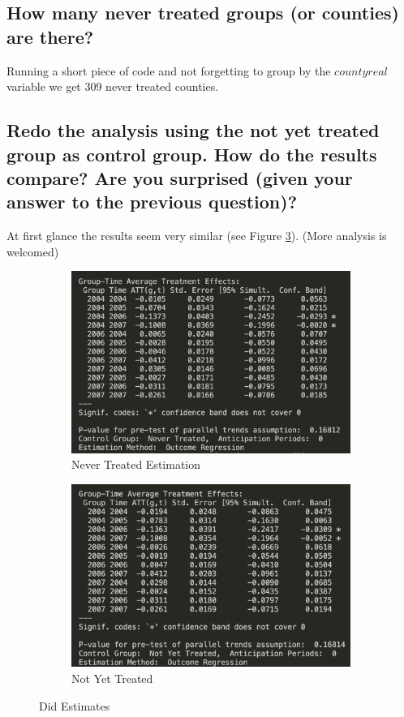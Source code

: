 \documentclass[12pt]{article}
\begin{document}
\subsection{How many never treated groups (or counties) are there?}
Running a short piece of code and not forgetting to group by the $countyreal$ variable we get 309 never treated counties.
\subsection{Redo the analysis using the not yet treated group as control group. How do the results compare? Are you surprised (given your answer to the previous question)?}
At first glance the results seem very similar (see Figure \ref{fig:both_images}). (More analysis is welcomed)
\begin{figure}[htbp]
    \centering
    \begin{subfigure}[b]{0.9\textwidth}
        \includegraphics[width=\textwidth]{media/never_treated.png} %
        \caption{Never Treated Estimation}
        \label{fig:img1}
    \end{subfigure}
    \hfill
    \begin{subfigure}[b]{0.9\textwidth}
        \includegraphics[width=\textwidth]{media/not_yet_treated.png} %
        \caption{Not Yet Treated}
        \label{fig:img2}
    \end{subfigure}
    \caption{Did Estimates}
    \label{fig:both_images}
\end{figure}
\end{document}
